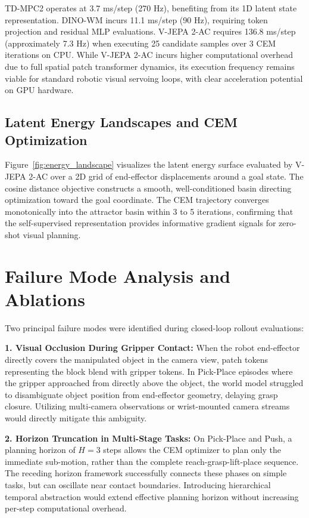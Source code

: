 \documentclass[10pt,journal,compsoc]{IEEEtran}
\begin{document}
TD-MPC2 operates at 3.7 ms/step (270 Hz), benefiting from its 1D latent state representation. DINO-WM incurs 11.1 ms/step (90 Hz), requiring token projection and residual MLP evaluations. V-JEPA 2-AC requires 136.8 ms/step (approximately 7.3 Hz) when executing 25 candidate samples over 3 CEM iterations on CPU. While V-JEPA 2-AC incurs higher computational overhead due to full spatial patch transformer dynamics, its execution frequency remains viable for standard robotic visual servoing loops, with clear acceleration potential on GPU hardware.

\subsection{Latent Energy Landscapes and CEM Optimization}

Figure~\ref{fig:energy_landscape} visualizes the latent energy surface evaluated by V-JEPA 2-AC over a 2D grid of end-effector displacements around a goal state. The cosine distance objective constructs a smooth, well-conditioned basin directing optimization toward the goal coordinate. The CEM trajectory converges monotonically into the attractor basin within 3 to 5 iterations, confirming that the self-supervised representation provides informative gradient signals for zero-shot visual planning.

\section{Failure Mode Analysis and Ablations}

Two principal failure modes were identified during closed-loop rollout evaluations:

\textbf{1. Visual Occlusion During Gripper Contact:} When the robot end-effector directly covers the manipulated object in the camera view, patch tokens representing the block blend with gripper tokens. In Pick-Place episodes where the gripper approached from directly above the object, the world model struggled to disambiguate object position from end-effector geometry, delaying grasp closure. Utilizing multi-camera observations or wrist-mounted camera streams would directly mitigate this ambiguity.

\textbf{2. Horizon Truncation in Multi-Stage Tasks:} On Pick-Place and Push, a planning horizon of $H=3$ steps allows the CEM optimizer to plan only the immediate sub-motion, rather than the complete reach-grasp-lift-place sequence. The receding horizon framework successfully connects these phases on simple tasks, but can oscillate near contact boundaries. Introducing hierarchical temporal abstraction would extend effective planning horizon without increasing per-step computational overhead.
\end{document}
